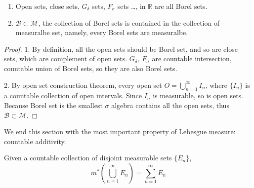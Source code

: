 \documentclass[lang=en, 12pt]{elegantbook}
\begin{document}
            \begin{proposition}
                \begin{enumerate}
                    \item Open sets, close sets, $G_{\delta}$ sets, $F_{\sigma}$ sets \dots, in $\mathbb{R}$ are all Borel sets.
                    \item $\mathcal{B} \subset \mathcal{M}$, the collection of Borel sets is contained in the collection of measuralbe set,
                    namely, every Borel sets are measuralbe.
                \end{enumerate}
                
            \end{proposition}
            \begin{proof}\par
                1. By definition, all the open sets should be Borel set, and so are close sets, which are complement of open sets.
            $G_{\delta}, \ F_{\sigma}$ are countable intersection, countable union of Borel sets, so they are also Borel sets. \par
                2. By open set construction theorem, every open set $O = \bigcup_{n=1}^{\infty} I_n$, where $\{I_n\}$ is a countable collection
            of open intervals. Since $I_n$ is measurable, so is open sets. Because Borel set is the smallest $\sigma$ algebra contains
            all the open sets, thus $\mathcal{B} \subset \mathcal{M}$.  
            \end{proof}
            We end this section with the most important property of Lebesgue measure: countable additivity.
            \begin{proposition}
                Given a countable collection of disjoint measurable sets $\{E_n\}$, 
                \begin{equation}
                    m^*(\bigcup_{n=1}^{\infty} E_n) = \sum_{n=1}^{\infty} E_n \label{ca}
                \end{equation}
                
            \end{proposition}
\end{document}
